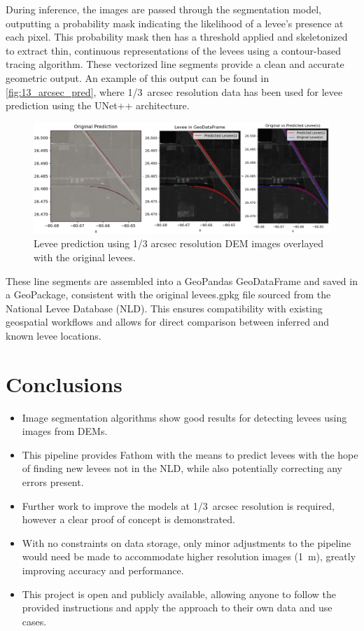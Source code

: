 \documentclass[NOTE, disdraft=true, UKenglish]{\DISCDTLATEXPATH UCLCDTDISdoc}
\begin{document}
During inference, the images are passed through the segmentation model, outputting a probability mask indicating the likelihood of a levee's presence at each pixel. This probability mask then has a threshold applied and skeletonized to extract thin, continuous representations of the levees using a contour-based tracing algorithm. These vectorized line segments provide a clean and accurate geometric output. An example of this output can be found in \autoref{fig:13_arcsec_pred}, where 1/3~arcsec resolution data has been used for levee prediction using the UNet++ architecture.

\begin{figure}[!h]
    \centering
    \includegraphics[width=0.75\linewidth]{figures/13_arcsec_performance.png}
    \caption{Levee prediction using 1/3 arcsec resolution DEM images overlayed with the original levees.}
    \label{fig:13_arcsec_pred}
\end{figure}

These line segments are assembled into a GeoPandas GeoDataFrame and saved in a GeoPackage, consistent with the original levees.gpkg file sourced from the National Levee Database (NLD). This ensures compatibility with existing geospatial workflows and allows for direct comparison between inferred and known levee locations.

\newpage
\section{Conclusions}
\label{sec:conclusion}
%
\begin{itemize}
    \item Image segmentation algorithms show good results for detecting levees using images from DEMs.
    \item This pipeline provides Fathom with the means to predict levees with the hope of finding new levees not in the NLD, while also potentially correcting any errors present.
    \item Further work to improve the models at 1/3~arcsec resolution is required, however a clear proof of concept is demonstrated.
    \item With no constraints on data storage, only minor adjustments to the pipeline would need be made to accommodate higher resolution images (1~m), greatly improving accuracy and performance.
    \item This project is open and publicly available, allowing anyone to follow the provided instructions and apply the approach to their own data and use cases.
\end{itemize}
\end{document}
